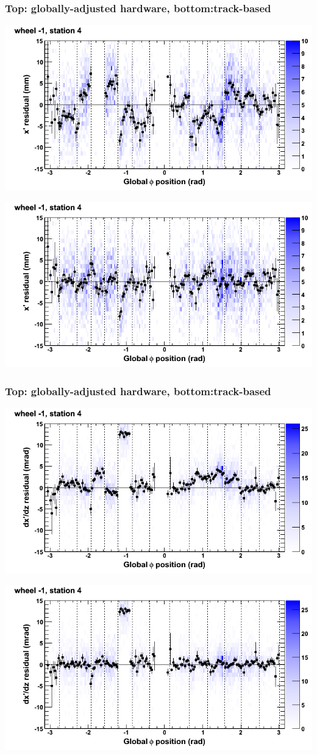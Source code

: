 \documentclass[compress]{beamer}
\begin{document}
\begin{frame}
\frametitle{Top: globally-adjusted hardware, bottom:track-based}
\includegraphics[width=0.7\linewidth]{NOV4_mapplots_HW/DTvsphi_st4whB_x.png}

\includegraphics[width=0.7\linewidth]{NOV4_mapplots/DTvsphi_st4whB_x.png}
\end{frame}

\begin{frame}
\frametitle{Top: globally-adjusted hardware, bottom:track-based}
\includegraphics[width=0.7\linewidth]{NOV4_mapplots_HW/DTvsphi_st4whB_dxdz.png}

\includegraphics[width=0.7\linewidth]{NOV4_mapplots/DTvsphi_st4whB_dxdz.png}
\end{frame}
\end{document}
